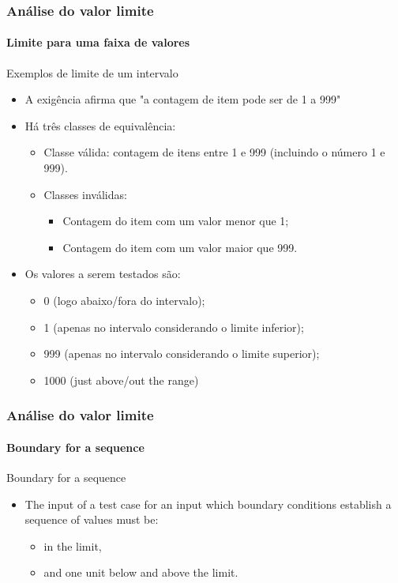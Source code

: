 \begin{frame}
\frametitle{Análise do valor limite}
\framesubtitle{Limite para uma faixa de valores}

\begin{block}{Exemplos de limite de um intervalo}
\begin{itemize}
	\item A exigência afirma que "a contagem de item pode ser de 1 a 999"

	\item Há três classes de equivalência:
	\begin{itemize}
		\item Classe válida: contagem de itens entre 1 e 999 (incluindo o número 1 e 999).
		\item Classes inválidas:
		\begin{itemize}
			\item Contagem do item com um valor menor que 1;
			\item Contagem do item com um valor maior que 999.
		\end{itemize}
	\end{itemize}

	\item Os valores a serem testados são:
	\begin{itemize}
		\item 0 (logo abaixo/fora do intervalo);
		\item 1 (apenas no intervalo considerando o limite inferior);
		\item 999 (apenas no intervalo considerando o limite superior);
		\item 1000 (just above/out the range)
	\end{itemize}
\end{itemize}
\end{block}
\end{frame}



\begin{frame}
\frametitle{Análise do valor limite}
\framesubtitle{Boundary for a sequence}

\begin{block:fact}{Boundary for a sequence}
\begin{itemize}
	\item The input of a test case for an input which boundary conditions
	establish a sequence of values must be:
	\begin{itemize}
		\item in the limit,
		\item and one unit below and above the limit.
	\end{itemize}
\end{itemize}
\end{block:fact}
\end{frame}


